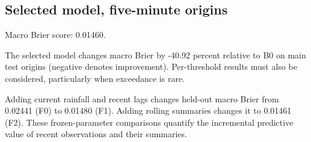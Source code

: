 \documentclass[11pt,a4paper]{article}
\begin{document}
\subsection{Selected model, five-minute origins}
\begin{table}[H]\centering\small
\caption{Selected model, five-minute origins}
\end{table}
Macro Brier score: 0.01460.

The selected model changes macro Brier by -40.92 percent relative to B0 on main test origins (negative denotes improvement). Per-threshold results must also be considered, particularly when exceedance is rare.

\begin{table}[H]\centering\small
\caption{Feature ablation with frozen winner family and hyperparameters}
\end{table}
Adding current rainfall and recent lags changes held-out macro Brier from 0.02441 (F0) to 0.01480 (F1). Adding rolling summaries changes it to 0.01461 (F2). These frozen-parameter comparisons quantify the incremental predictive value of recent observations and their summaries.
\end{document}

